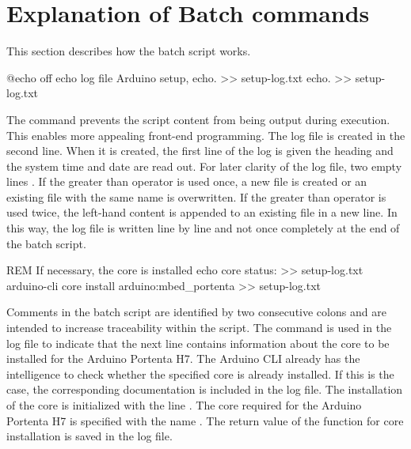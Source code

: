 \section{Explanation of Batch commands}

This section describes how the batch script works.

\medskip

{\small 
	\begin{PowerShell}
@echo off
echo log file Arduino setup, %
echo. >> setup-log.txt
echo. >> setup-log.txt
	\end{PowerShell}
}

\medskip


The command  prevents the script content from being output during execution. This enables more appealing front-end programming. The log file is created in the second line. When it is created, the first line of the log is given the heading  and the system time  and date  are read out. For later clarity of the log file, two empty lines . If the greater than operator  is used once, a new file is created or an existing file with the same name is overwritten. If the greater than operator  is used twice, the left-hand content is appended to an existing file in a new line. In this way, the log file is written line by line and not once completely at the end of the batch script.

\medskip


{\small 
	\begin{PowerShell}
REM If necessary, the core is installed
echo core status: >> setup-log.txt
arduino-cli core install arduino:mbed_portenta >> setup-log.txt
	\end{PowerShell}
}

\medskip


Comments in the batch script are identified by two consecutive colons  and are intended to increase traceability within the script. The command  is used in the log file to indicate that the next line contains information about the core to be installed for the Arduino Portenta H7. The Arduino CLI already has the intelligence to check whether the specified core is already installed. If this is the case, the corresponding documentation is included in the log file. The installation of the core is initialized with the line . The core required for the Arduino Portenta H7 is specified with the name . The return value of the function for core installation is saved in the log file.


